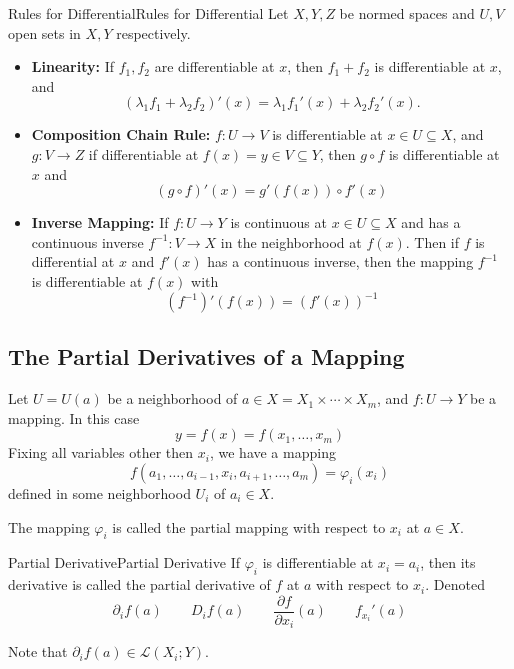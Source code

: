 \documentclass[../main.tex]{subfiles}
\begin{document}
\begin{proposition}{Rules for Differential}{Rules for Differential}
Let $X,Y,Z$ be normed spaces and $U,V$ open sets in $X,Y$ respectively.
\begin{itemize}
\item \textbf{Linearity: }If $f_1,f_2$ are differentiable at $x$, then $f_1+f_2$ is differentiable at $x$, and
	\begin{equation*}
	(\lambda_1f_1 + \lambda_2f_2)'(x) = \lambda_1f_1'(x) + \lambda_2f_2'(x).
	\end{equation*}
\item \textbf{Composition Chain Rule: } $f:U \rightarrow V$ is differentiable at $x\in U \subseteq X$, and $g:V \rightarrow Z$ if differentiable at $f(x)=y\in V \subseteq Y$, then $g\circ f$ is differentiable at $x$ and
	\begin{equation*}
		(g\circ f)'(x) = g'(f(x))\circ f'(x)
	\end{equation*}
\item \textbf{Inverse Mapping: } If $f:U \rightarrow Y$ is continuous at $x \in U \subseteq X$ and has a continuous inverse $f^{-1}:V \rightarrow  X$ in the neighborhood at $f(x)$. Then if $f$ is differential at $x$ and $f'(x)$ has a continuous inverse, then the mapping $f^{-1}$ is differentiable at $f(x)$ with
	\begin{equation*}
		(f^{-1})'(f(x)) = (f'(x))^{-1}
	\end{equation*}
\end{itemize}
\end{proposition}

\subsection{The Partial Derivatives of a Mapping}
Let $U = U(a)$ be a neighborhood of $a\in X = X_1 \times \cdots \times X_m$, and $f: U \rightarrow Y$ be a mapping. In this case
\begin{equation*}
y=f(x) = f(x_1, \ldots ,x_m)
\end{equation*}
Fixing all variables other then $x_i$, we have a mapping
\begin{equation*}
f(a_1, \ldots ,a _{i-1}, x_i , a _{i+1}, \ldots ,a_m) = \varphi_i(x_i)
\end{equation*}
defined in some neighborhood $U_i$ of $a_i\in X$.

The mapping $\varphi_i$ is called the partial mapping with respect to $x_i$ at $a\in X$.

\begin{definition}{Partial Derivative}{Partial Derivative}
If $\varphi_i$ is differentiable at $x_i=a_i$, then its derivative is called the partial derivative of $f$ at $a$ with  respect to $x_i$. Denoted
\begin{equation*}
\partial _i f(a)\qquad D_if(a)\qquad \frac{\partial f}{\partial x_i}(a)\qquad f_{x_i}'(a)
\end{equation*}
\end{definition}
Note that $\partial _if(a)\in \mathscr{L}(X_i;Y)$.
\end{document}
